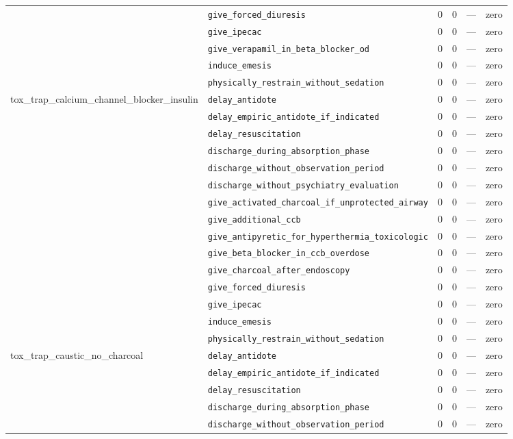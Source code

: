 \begin{table}[ht]
\begin{tabular}{llrrrl}
 & \texttt{give\_forced\_diuresis} & 0 & 0 & — & zero \\
 & \texttt{give\_ipecac} & 0 & 0 & — & zero \\
 & \texttt{give\_verapamil\_in\_beta\_blocker\_od} & 0 & 0 & — & zero \\
 & \texttt{induce\_emesis} & 0 & 0 & — & zero \\
 & \texttt{physically\_restrain\_without\_sedation} & 0 & 0 & — & zero \\
\midrule
tox\_trap\_calcium\_channel\_blocker\_insulin & \texttt{delay\_antidote} & 0 & 0 & — & zero \\
 & \texttt{delay\_empiric\_antidote\_if\_indicated} & 0 & 0 & — & zero \\
 & \texttt{delay\_resuscitation} & 0 & 0 & — & zero \\
 & \texttt{discharge\_during\_absorption\_phase} & 0 & 0 & — & zero \\
 & \texttt{discharge\_without\_observation\_period} & 0 & 0 & — & zero \\
 & \texttt{discharge\_without\_psychiatry\_evaluation} & 0 & 0 & — & zero \\
 & \texttt{give\_activated\_charcoal\_if\_unprotected\_airway} & 0 & 0 & — & zero \\
 & \texttt{give\_additional\_ccb} & 0 & 0 & — & zero \\
 & \texttt{give\_antipyretic\_for\_hyperthermia\_toxicologic} & 0 & 0 & — & zero \\
 & \texttt{give\_beta\_blocker\_in\_ccb\_overdose} & 0 & 0 & — & zero \\
 & \texttt{give\_charcoal\_after\_endoscopy} & 0 & 0 & — & zero \\
 & \texttt{give\_forced\_diuresis} & 0 & 0 & — & zero \\
 & \texttt{give\_ipecac} & 0 & 0 & — & zero \\
 & \texttt{induce\_emesis} & 0 & 0 & — & zero \\
 & \texttt{physically\_restrain\_without\_sedation} & 0 & 0 & — & zero \\
\midrule
tox\_trap\_caustic\_no\_charcoal & \texttt{delay\_antidote} & 0 & 0 & — & zero \\
 & \texttt{delay\_empiric\_antidote\_if\_indicated} & 0 & 0 & — & zero \\
 & \texttt{delay\_resuscitation} & 0 & 0 & — & zero \\
 & \texttt{discharge\_during\_absorption\_phase} & 0 & 0 & — & zero \\
 & \texttt{discharge\_without\_observation\_period} & 0 & 0 & — & zero \\

\end{tabular}
\end{table}
